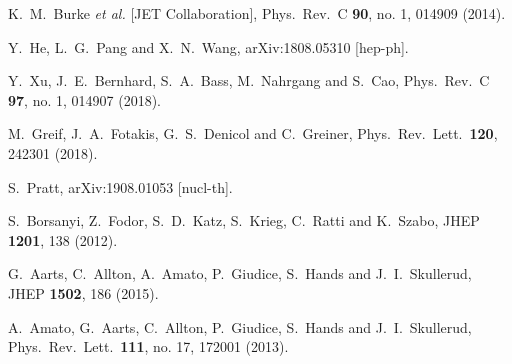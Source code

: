 \begin{thebibliography}{99}
  K.~M.~Burke {\it et al.} [JET Collaboration],
  Phys.\ Rev.\ C {\bf 90}, no. 1, 014909 (2014).

  Y.~He, L.~G.~Pang and X.~N.~Wang,
  arXiv:1808.05310 [hep-ph].

  Y.~Xu, J.~E.~Bernhard, S.~A.~Bass, M.~Nahrgang and S.~Cao,
  Phys.\ Rev.\ C {\bf 97}, no. 1, 014907 (2018).
  
  M.~Greif, J.~A.~Fotakis, G.~S.~Denicol and C.~Greiner,
  Phys.\ Rev.\ Lett.\  {\bf 120}, 242301 (2018).

  S.~Pratt,
  arXiv:1908.01053 [nucl-th].

  S.~Borsanyi, Z.~Fodor, S.~D.~Katz, S.~Krieg, C.~Ratti and K.~Szabo,
  JHEP {\bf 1201}, 138 (2012).

  G.~Aarts, C.~Allton, A.~Amato, P.~Giudice, S.~Hands and J.~I.~Skullerud,
  JHEP {\bf 1502}, 186 (2015).

  A.~Amato, G.~Aarts, C.~Allton, P.~Giudice, S.~Hands and J.~I.~Skullerud,
  Phys.\ Rev.\ Lett.\  {\bf 111}, no. 17, 172001 (2013).


\end{thebibliography}
